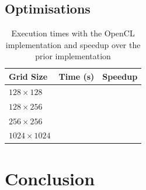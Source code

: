 \documentclass[twocolumn, a4paper]{article}
\begin{document}
\subsection{Optimisations}

\begin{table}[htbp]
  \begin{center}
  \caption{Execution times with the OpenCL implementation and speedup over the prior implementation}\label{tab:OpenCL_2}
  \begin{tabular}[t]{l | l l} 
      \hline\hline
      Grid Size&Time (s)&Speedup\\
      \hline
      $128 \times 128$&\texttt{}&\texttt{}\\
      $128 \times 256$&\texttt{}&\texttt{}\\
      $256 \times 256$&\texttt{}&\texttt{}\\
      $1024 \times 1024$&\texttt{}&\texttt{}\\
      \hline
    \end{tabular}
  \end{center}
\end{table}

\section{Conclusion}

\printbibliography
\end{document}
